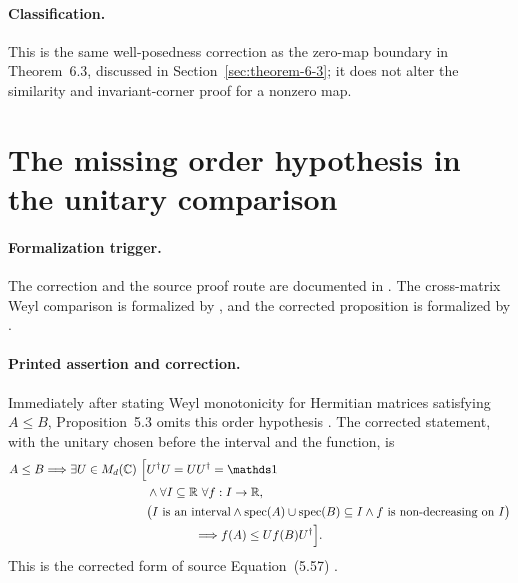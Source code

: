 \documentclass{article}
\begin{document}
\paragraph{Classification.}
This is the same well-posedness correction as the zero-map boundary in
Theorem~6.3, discussed in Section~\ref{sec:theorem-6-3}; it does not alter the
similarity and invariant-corner proof for a nonzero map.

\section{The missing order hypothesis in the unitary comparison}
\label{sec:unitary-comparison}

\paragraph{Formalization trigger.}
The correction and the source proof route are documented in
. The
cross-matrix Weyl comparison is formalized by
, and the
corrected proposition is formalized by
.

\paragraph{Printed assertion and correction.}
Immediately after stating Weyl monotonicity for Hermitian matrices satisfying
$A\leq B$, Proposition~5.3 omits this order hypothesis
\cite[Proposition~5.3]{Wolf2012Quantum}. The corrected statement, with the
unitary chosen before the interval and the function, is
\begin{align}
    A\leq B
        \Longrightarrow
        \exists U\in M_d(\mathbb C)\ \Bigl[
        &U^\dagger U=UU^\dagger=\Id
    \label{eq:wolf_lecture_notes_errata_unitary_comparison_unitary}\\
        &{}\land
        \forall I\subseteq\mathbb R\ \forall f:I\to\mathbb R,\nonumber\\
        &\bigl(      I\text{ is an interval}
          \land
          \operatorname{spec}(A)\cup\operatorname{spec}(B)\subseteq I
          \land
          f\text{ is non-decreasing on }I
          \bigr)\nonumber\\
        &\hspace{4em}\Longrightarrow
          f(A)\leq Uf(B)U^\dagger
        \Bigr].
    \label{eq:wolf_lecture_notes_errata_unitary_comparison_corrected_statement}
\end{align}
This is the corrected form of source Equation~(5.57)
\cite[Equation~(5.57)]{Wolf2012Quantum}.
\end{document}
